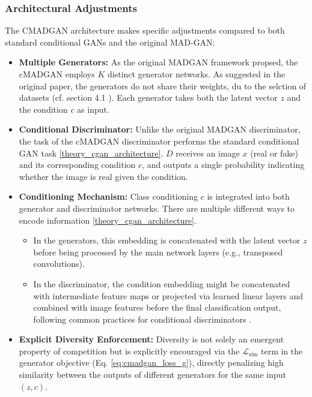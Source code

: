 \subsubsection{Architectural Adjustments}
\label{theory_cmadgan_architecture}

The CMADGAN architecture makes specific adjustments compared to both standard conditional GANs and the original MAD-GAN:

\begin{itemize}
    \item \textbf{Multiple Generators:}
    As the original MADGAN framework propsed, the cMADGAN employs \(K\) distinct generator networks. As suggested in the original paper, the generators do not share their weights, du to the selction of datasets (cf. section 4.1 \cite{ghosh2018madgan}). Each generator takes both the latent vector \( z \) and the condition \( c \) as input.
    \item \textbf{Conditional Discriminator:}
    Unlike the original MADGAN discriminator, the task of the cMADGAN discriminator performs the standard conditional GAN task \ref{theory_cgan_architecture}. \(D\) receives an image \( x \) (real or fake) and its corresponding condition \( c \), and outputs a single probability indicating whether the image is real given the condition.
    \item \textbf{Conditioning Mechanism:} Class conditioning \( c \) is integrated into both generator and discriminator networks. There are multiple different ways to encode information \ref{theory_cgan_architecture}.
        \begin{itemize}
            \item In the generators, this embedding is concatenated with the latent vector \( z \) before being processed by the main network layers (e.g., transposed convolutions).
            \item In the discriminator, the condition embedding might be concatenated with intermediate feature maps or projected via learned linear layers and combined with image features before the final classification output, following common practices for conditional discriminators \cite{mirza2014conditionalgenerativeadversarialnets}.
        \end{itemize}
    \item \textbf{Explicit Diversity Enforcement:} Diversity is not solely an emergent property of competition but is explicitly encouraged via the \( \mathcal{L}_{\text{sim}} \) term in the generator objective (Eq. \ref{eq:cmadgan_loss_g}), directly penalizing high similarity between the outputs of different generators for the same input \( (z, c) \).
\end{itemize}

